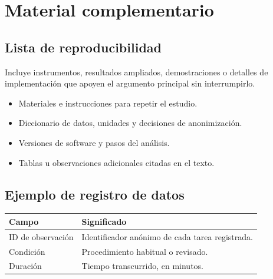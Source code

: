 \appendix
\chapter{Material complementario}
\label{app:materials}
\section{Lista de reproducibilidad}
Incluye instrumentos, resultados ampliados, demostraciones o detalles de
implementación que apoyen el argumento principal sin interrumpirlo.
\begin{itemize}
\item Materiales e instrucciones para repetir el estudio.
\item Diccionario de datos, unidades y decisiones de anonimización.
\item Versiones de software y pasos del análisis.
\item Tablas u observaciones adicionales citadas en el texto.
\end{itemize}
\section{Ejemplo de registro de datos}
\begin{tabularx}{\linewidth}{@{}lX@{}}
\toprule
\textbf{Campo} & \textbf{Significado}\\
\midrule
ID de observación & Identificador anónimo de cada tarea registrada.\\
Condición & Procedimiento habitual o revisado.\\
Duración & Tiempo transcurrido, en minutos.\\
\bottomrule
\end{tabularx}

